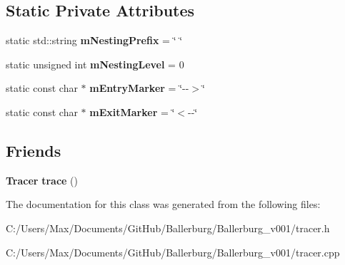 \subsection*{Static Private Attributes}
\begin{DoxyCompactItemize}
\item 
static std\+::string {\bfseries m\+Nesting\+Prefix} = \char`\"{} \char`\"{}\label{class_tracer_a32ad1a5d6e689d06c259f88b9432010a}

\item 
static unsigned int {\bfseries m\+Nesting\+Level} = 0\label{class_tracer_a4efa861c05de5595a8a89e5fe4ee1385}

\item 
static const char $\ast$ {\bfseries m\+Entry\+Marker} = \char`\"{}-\/-\/$>$\char`\"{}\label{class_tracer_af9d3c06a9d574403f89fc31d8fe8057f}

\item 
static const char $\ast$ {\bfseries m\+Exit\+Marker} = \char`\"{}$<$-\/-\/\char`\"{}\label{class_tracer_a34b484a04fa381a40443c8ce4da16ba4}

\end{DoxyCompactItemize}
\subsection*{Friends}
\begin{DoxyCompactItemize}
\item 
{\bf Tracer} {\bfseries trace} ()\label{class_tracer_aba74df155ca9fabb2e45947113f50944}

\end{DoxyCompactItemize}


The documentation for this class was generated from the following files\+:\begin{DoxyCompactItemize}
\item 
C\+:/\+Users/\+Max/\+Documents/\+Git\+Hub/\+Ballerburg/\+Ballerburg\+\_\+v001/tracer.\+h\item 
C\+:/\+Users/\+Max/\+Documents/\+Git\+Hub/\+Ballerburg/\+Ballerburg\+\_\+v001/tracer.\+cpp\end{DoxyCompactItemize}
